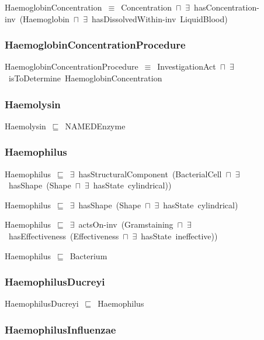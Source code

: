 \documentclass{article}
\begin{document}
HaemoglobinConcentration~\ensuremath{\equiv}~Concentration~\ensuremath{\sqcap}~\ensuremath{\exists}~hasConcentration-inv~(Haemoglobin~\ensuremath{\sqcap}~\ensuremath{\exists}~hasDissolvedWithin-inv~LiquidBlood)

\subsubsection*{HaemoglobinConcentrationProcedure}

HaemoglobinConcentrationProcedure~\ensuremath{\equiv}~InvestigationAct~\ensuremath{\sqcap}~\ensuremath{\exists}~isToDetermine~HaemoglobinConcentration

\subsubsection*{Haemolysin}

Haemolysin~\ensuremath{\sqsubseteq}~NAMEDEnzyme~

\subsubsection*{Haemophilus}

Haemophilus~\ensuremath{\sqsubseteq}~\ensuremath{\exists}~hasStructuralComponent~(BacterialCell~\ensuremath{\sqcap}~\ensuremath{\exists}~hasShape~(Shape~\ensuremath{\sqcap}~\ensuremath{\exists}~hasState~cylindrical))~

Haemophilus~\ensuremath{\sqsubseteq}~\ensuremath{\exists}~hasShape~(Shape~\ensuremath{\sqcap}~\ensuremath{\exists}~hasState~cylindrical)~

Haemophilus~\ensuremath{\sqsubseteq}~\ensuremath{\exists}~actsOn-inv~(Gramstaining~\ensuremath{\sqcap}~\ensuremath{\exists}~hasEffectiveness~(Effectiveness~\ensuremath{\sqcap}~\ensuremath{\exists}~hasState~ineffective))~

Haemophilus~\ensuremath{\sqsubseteq}~Bacterium~

\subsubsection*{HaemophilusDucreyi}

HaemophilusDucreyi~\ensuremath{\sqsubseteq}~Haemophilus~

\subsubsection*{HaemophilusInfluenzae}
\end{document}
